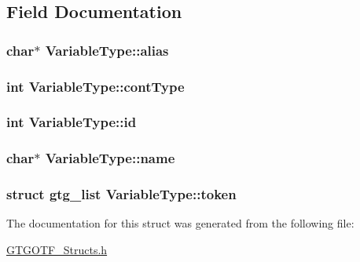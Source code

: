 \subsection{Field Documentation}
\hypertarget{structVariableType_a1f40c8f260ce4672bdcbaadc59282c42}{
\subsubsection[{alias}]{\setlength{\rightskip}{0pt plus 5cm}char$\ast$ Variable\-Type\-::alias}}\label{structVariableType_a1f40c8f260ce4672bdcbaadc59282c42}
\hypertarget{structVariableType_a5183bdba4b0391794706ba8a81f96be7}{
\subsubsection[{cont\-Type}]{\setlength{\rightskip}{0pt plus 5cm}int Variable\-Type\-::cont\-Type}}\label{structVariableType_a5183bdba4b0391794706ba8a81f96be7}
\hypertarget{structVariableType_ad770137e0e1b6071aebe2df4fd23a975}{
\subsubsection[{id}]{\setlength{\rightskip}{0pt plus 5cm}int Variable\-Type\-::id}}\label{structVariableType_ad770137e0e1b6071aebe2df4fd23a975}
\hypertarget{structVariableType_a2e98ef3f43fc7bb3b5f35c608e465626}{
\subsubsection[{name}]{\setlength{\rightskip}{0pt plus 5cm}char$\ast$ Variable\-Type\-::name}}\label{structVariableType_a2e98ef3f43fc7bb3b5f35c608e465626}
\hypertarget{structVariableType_a2dc230e2da906c4f1d4fc4fcab2f365a}{
\subsubsection[{token}]{\setlength{\rightskip}{0pt plus 5cm}struct {\bf gtg\-\_\-list} Variable\-Type\-::token}}\label{structVariableType_a2dc230e2da906c4f1d4fc4fcab2f365a}


The documentation for this struct was generated from the following file\-:\begin{DoxyCompactItemize}
\item 
\hyperlink{GTGOTF__Structs_8h}{G\-T\-G\-O\-T\-F\-\_\-\-Structs.\-h}\end{DoxyCompactItemize}
